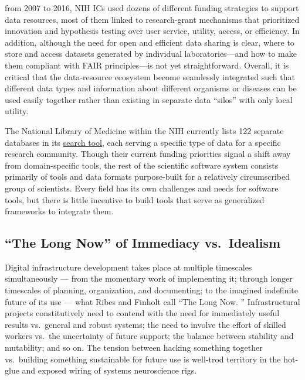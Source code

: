 \begin{leftbar}
from 2007 to 2016, NIH ICs used dozens of different funding strategies
to support data resources, most of them linked to research-grant
mechanisms that prioritized innovation and hypothesis testing over user
service, utility, access, or efficiency. In addition, although the need
for open and efficient data sharing is clear, where to store and access
datasets generated by individual laboratories---and how to make them
compliant with FAIR principles---is not yet straightforward. Overall, it
is critical that the data-resource ecosystem become seamlessly
integrated such that different data types and information about
different organisms or diseases can be used easily together rather than
existing in separate data ``silos'' with only local utility.
\end{leftbar}

The National Library of Medicine within the NIH currently lists 122
separate databases in its
\href{https://eresources.nlm.nih.gov/nlm_eresources/}{search tool}, each
serving a specific type of data for a specific research community.
Though their current funding priorities signal a shift away from
domain-specific tools, the rest of the scientific software system
consists primarily of tools and data formats purpose-built for a
relatively circumscribed group of scientists. Every field has its own
challenges and needs for software tools, but there is little incentive
to build tools that serve as generalized frameworks to integrate them.

\hypertarget{the-long-now-of-immediacy-vs.-idealism}{%
\subsection{``The Long Now'' of Immediacy
vs.~Idealism}\label{the-long-now-of-immediacy-vs.-idealism}}

Digital infrastructure development takes place at multiple timescales
simultaneously --- from the momentary work of implementing it; through
longer timescales of planning, organization, and documenting; to the
imagined indefinite future of its use --- what Ribes and Finholt call
``The Long Now. \citep{ribesLongNowTechnology2009} ''
Infrastructural projects constitutively need to contend with the need
for immediately useful results vs.~general and robust systems; the need
to involve the effort of skilled workers vs.~the uncertainty of future
support; the balance between stability and mutability; and so on. The
tension between hacking something together vs.~building something
sustainable for future use is well-trod territory in the hot-glue and
exposed wiring of systems neuroscience rigs.


